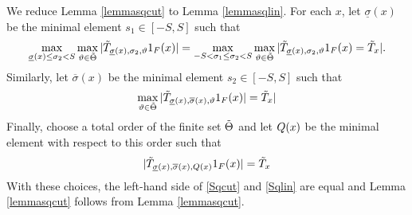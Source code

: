 We reduce Lemma \ref{lemmasqcut}  to
Lemma \ref{lemmasqlin}.
For each $x$, let $\underline{\sigma}(x)$ be the
minimal element $s_1\in [-S,S]$ such that
\[\max_{\underline{\sigma}(x)\le \sigma_2<S}\max_{\vartheta\in\tilde{\Theta}}
| \Tilde{T}_{\underline{\sigma}(x),\sigma_2,\vartheta} 1_{F}(x)|
=
\max_{-S<\sigma_1\le \sigma_2<S}\max_{\vartheta\in\tilde{\Theta}}
| \Tilde{T}_{\underline{\sigma}(x),\sigma_2,\vartheta} 1_{F}(x)=\Tilde{T}_x|.
\]
Similarly, let $\overline{\sigma}(x)$ be the
minimal element $s_2\in [-S,S]$ such that
\[\max_{\vartheta\in\tilde{\Theta}}
| \Tilde{T}_{\underline{\sigma}(x),\overline{\sigma}(x),\vartheta} 1_{F}(x)|
=
\Tilde{T}_x|
\]
Finally, choose a total order of the finite set $\tilde{\Theta}$
and let ${Q}(x)$ be the minimal element with respect to this order such that
\[
| \Tilde{T}_{\underline{\sigma}(x),\overline{\sigma}(x),{Q}(x)} 1_{F}(x)| = \Tilde{T}_x
\]
With these choices, the left-hand side of \eqref{Sqcut}
and \eqref{Sqlin} are equal and Lemma \ref{lemmasqcut}
follows from Lemma \ref{lemmasqcut}.

